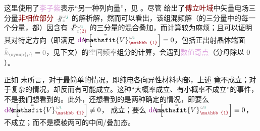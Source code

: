 这里使用了\textcolor{Plum}{李子紫}表示“另一种列向量”，见 。尽管  给出了\textcolor{Maroon}{傅立叶域}中矢量电场三分量\textcolor{Maroon}{非相位部分} $\Xint{{}^{}_{\mathcolor{gray}{-}}}{10}{\bar{g}}^{\;\!\mathcolor{gray}{\omega} \textcolor{PineGreen}{\jmath}}_{\;\! \mathcolor{gray}{z}}$ 的解析解，然而可以看出，该组混频解（的三分量中的每一个分量，都）因含有 $\Xint{\mathcolor{gray}{-}}{24}{\bar{P}}^{\;\! \mathcolor{gray}{\omega} \textcolor{PineGreen}{\imath}}_{\;\! \mathcolor{gray}{z} \textcolor{Maroon}{(2)}}$ 的三分量的混合叠加，而计算较为麻烦；且可以证明其对特定方向（即满足 $\textcolor{Plum}{\det} \left[ \Xint{\mathcolor{gray}{-}}{25}{\bar{\bar{\mathsfit{V}}}}^{\;\! \mathcolor{gray}{\omega} \textcolor{PineGreen}{\imath}}_{\textcolor{Maroon}{\mathbb{1}}} \right] = 0$，包括正出射晶体端面 $\mathcolor{gray}{\bar{k}_{\symup{\rho}}} = \mathcolor{gray}{\bar{0}}$，见下文）的\textcolor{gray}{空间频率}组分的计算，会遇到\textcolor{Plum}{数值奇点}（分母除以 $0$）。

正如  末所言，对于最简单的情况，即\textcolor{PineGreen}{纯电各向异性}材料内部，上述  竟不成立；对于复杂的情况，却反而有可能成立。这种“大概率成立、有小概率不成立”的事件，不是我们想看到的。此外，还想看到的是两种确定的情况，即要么 $\textcolor{Plum}{\det} \left[ \Xint{\mathcolor{gray}{-}}{25}{\bar{\bar{\mathsfit{V}}}}^{\;\! \mathcolor{gray}{\omega} \textcolor{PineGreen}{\imath}}_{\textcolor{Maroon}{\mathbb{1}}} \right] \not\equiv 0$， 成立；要么 $\textcolor{Plum}{\det} \left[ \Xint{\mathcolor{gray}{-}}{25}{\bar{\bar{\mathsfit{V}}}}^{\;\! \mathcolor{gray}{\omega} \textcolor{PineGreen}{\imath}}_{\textcolor{Maroon}{\mathbb{1}}} \right] \equiv 0$， 不成立；而不是模棱两可的中间/叠加态。

